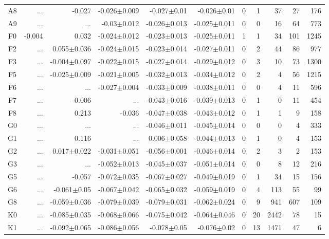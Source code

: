 \begin{table}[t]
\begin{table}[t]
\begin{center}
\begin{tabular}{c|rrrrr|rrrrr}
    A8	&	 ...	&	-0.027	&	-0.026$\pm$0.009	&	-0.027$\pm$0.01	&	-0.026$\pm$0.01	&	0	&	1	&	37	&	27	&	176	\\
    A9	&	 ...	&	 ...	&	-0.03$\pm$0.012	&	-0.026$\pm$0.013	&	-0.025$\pm$0.011	&	0	&	0	&	16	&	64	&	773	\\
    F0	&	-0.004	&	0.032	&	-0.024$\pm$0.012	&	-0.023$\pm$0.013	&	-0.025$\pm$0.011	&	1	&	1	&	34	&	101	&	1245	\\
    F2	&	 ...	&	0.055$\pm$0.036	&	-0.024$\pm$0.015	&	-0.023$\pm$0.014	&	-0.027$\pm$0.011	&	0	&	2	&	44	&	86	&	977	\\
    F3	&	 ...	&	-0.004$\pm$0.097	&	-0.022$\pm$0.015	&	-0.027$\pm$0.014	&	-0.029$\pm$0.012	&	0	&	3	&	10	&	73	&	1300	\\
    F5	&	 ...	&	-0.025$\pm$0.009	&	-0.021$\pm$0.005	&	-0.032$\pm$0.013	&	-0.034$\pm$0.012	&	0	&	2	&	4	&	56	&	1215	\\
    F6	&	 ...	&	 ...	&	-0.027$\pm$0.004	&	-0.033$\pm$0.009	&	-0.038$\pm$0.011	&	0	&	0	&	4	&	11	&	596	\\
    F7	&	 ...	&	-0.006	&	 ...	&	-0.043$\pm$0.016	&	-0.039$\pm$0.013	&	0	&	1	&	0	&	11	&	454	\\
    F8	&	 ...	&	0.213	&	-0.036	&	-0.047$\pm$0.038	&	-0.043$\pm$0.012	&	0	&	1	&	1	&	9	&	158	\\
    G0	&	 ...	&	 ...	&	 ...	&	-0.046$\pm$0.011	&	-0.045$\pm$0.014	&	0	&	0	&	0	&	4	&	333	\\
    G1	&	 ...	&	0.116	&	 ...	&	0.006$\pm$0.058	&	-0.044$\pm$0.013	&	0	&	1	&	0	&	4	&	153	\\
    G2	&	 ...	&	0.017$\pm$0.022	&	-0.031$\pm$0.051	&	-0.056$\pm$0.001	&	-0.046$\pm$0.014	&	0	&	2	&	3	&	2	&	153	\\
    G3	&	 ...	&	 ...	&	-0.052$\pm$0.013	&	-0.045$\pm$0.037	&	-0.051$\pm$0.014	&	0	&	0	&	8	&	12	&	216	\\
    G5	&	 ...	&	-0.057	&	-0.072$\pm$0.035	&	-0.067$\pm$0.027	&	-0.049$\pm$0.019	&	0	&	1	&	34	&	15	&	156	\\
    G6	&	 ...	&	-0.061$\pm$0.05	&	-0.067$\pm$0.042	&	-0.065$\pm$0.032	&	-0.059$\pm$0.019	&	0	&	4	&	113	&	55	&	99	\\
    G8	&	 ...	&	-0.059$\pm$0.036	&	-0.079$\pm$0.039	&	-0.079$\pm$0.031	&	-0.062$\pm$0.024	&	0	&	9	&	941	&	607	&	109	\\
    K0	&	 ...	&	-0.085$\pm$0.035	&	-0.068$\pm$0.066	&	-0.075$\pm$0.042	&	-0.064$\pm$0.046	&	0	&	20	&	2442	&	78	&	15	\\
    K1	&	 ...	&	-0.092$\pm$0.065	&	-0.086$\pm$0.056	&	-0.078$\pm$0.05	&	-0.076$\pm$0.02	&	0	&	13	&	1471	&	47	&	6	\\

\end{tabular}
\end{center}
\end{table}
\end{table}
